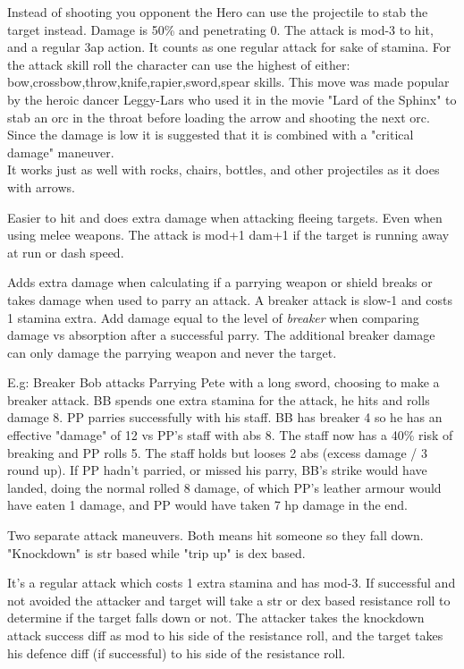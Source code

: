  Instead of shooting you opponent the Hero can use the projectile to stab the target instead. Damage is 50\% and penetrating 0. The attack is mod-3 to hit, and a regular 3ap action. It counts as one regular attack for sake of stamina. For the attack skill roll the character can use the highest of either: bow,crossbow,throw,knife,rapier,sword,spear skills.
This move was made popular by the heroic dancer Leggy-Lars who used it in the movie "Lard of the Sphinx" to stab an orc in the throat before loading the arrow and shooting the next orc. Since the damage is low it is suggested that it is combined with a "critical damage" maneuver. \\
It works just as well with rocks, chairs, bottles, and other projectiles as it does with arrows.


 Easier to hit and does extra damage when attacking fleeing targets. Even when using melee weapons. The attack is mod+1 dam+1 if the target is running away at run or dash speed.


 Adds extra damage when calculating if a parrying weapon or shield breaks or takes damage when used to parry an attack. A breaker attack is slow-1 and costs 1 stamina extra. Add damage equal to the level of \emph{breaker} when comparing damage vs absorption after a successful parry. The additional breaker damage can only damage the parrying weapon and never the target.

E.g: Breaker Bob attacks Parrying Pete with a long sword, choosing to make a breaker attack. BB spends one extra stamina for the attack, he hits and rolls damage 8. PP parries successfully with his staff. BB has breaker 4 so he has an effective "damage" of 12 vs PP's staff with abs 8. The staff now has a 40\% risk of breaking and PP rolls 5. The staff holds but looses 2 abs (excess damage / 3 round up). If PP hadn't parried, or missed his parry, BB's strike would have landed, doing the normal rolled 8 damage, of which PP's leather armour would have eaten 1 damage, and PP would have taken 7 hp damage in the end.


 Two separate attack maneuvers. Both means hit someone so they fall down. "Knockdown" is str based while "trip up" is dex based.

It's a regular attack which costs 1 extra stamina and has mod-3. If successful and not avoided the attacker and target will take a str or dex based resistance roll to determine if the target falls down or not. The attacker takes the knockdown attack success diff as mod to his side of the resistance roll, and the target takes his defence diff (if successful) to his side of the resistance roll.


